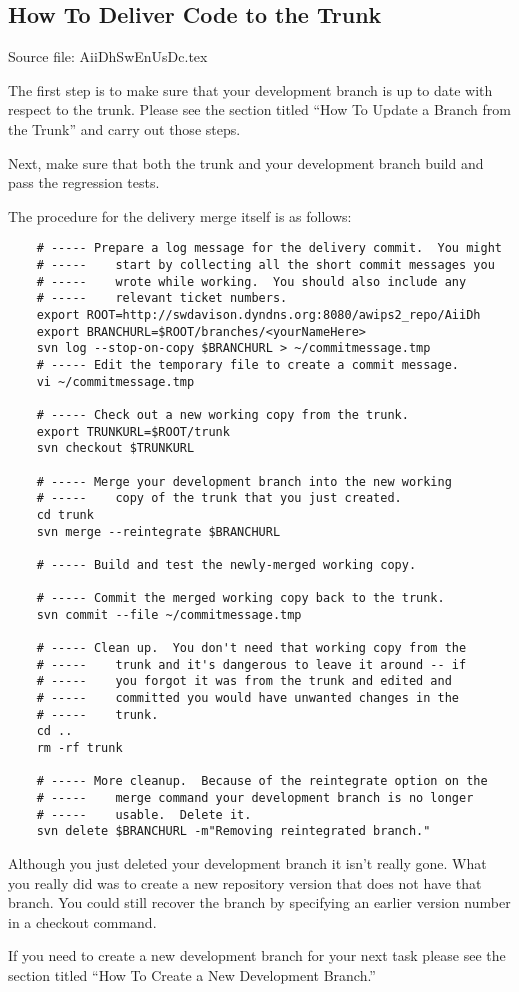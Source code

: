 
\subsection{How To Deliver Code to the Trunk}

Source file: AiiDhSwEnUsDc.tex

The first step is to make sure that your development branch is 
up to date with respect to the trunk.  Please see the section
titled ``How To Update a Branch from the Trunk'' and carry out
those steps.

Next, make sure that both the trunk and your development branch
build and pass the regression tests.

The procedure for the delivery merge itself is as follows:

\begin{verbatim}
    # ----- Prepare a log message for the delivery commit.  You might
    # -----    start by collecting all the short commit messages you
    # -----    wrote while working.  You should also include any 
    # -----    relevant ticket numbers.
    export ROOT=http://swdavison.dyndns.org:8080/awips2_repo/AiiDh
    export BRANCHURL=$ROOT/branches/<yourNameHere>
    svn log --stop-on-copy $BRANCHURL > ~/commitmessage.tmp
    # ----- Edit the temporary file to create a commit message.
    vi ~/commitmessage.tmp

    # ----- Check out a new working copy from the trunk.
    export TRUNKURL=$ROOT/trunk
    svn checkout $TRUNKURL

    # ----- Merge your development branch into the new working
    # -----    copy of the trunk that you just created.
    cd trunk
    svn merge --reintegrate $BRANCHURL

    # ----- Build and test the newly-merged working copy.

    # ----- Commit the merged working copy back to the trunk.
    svn commit --file ~/commitmessage.tmp

    # ----- Clean up.  You don't need that working copy from the 
    # -----    trunk and it's dangerous to leave it around -- if
    # -----    you forgot it was from the trunk and edited and 
    # -----    committed you would have unwanted changes in the
    # -----    trunk.
    cd ..
    rm -rf trunk

    # ----- More cleanup.  Because of the reintegrate option on the
    # -----    merge command your development branch is no longer 
    # -----    usable.  Delete it.
    svn delete $BRANCHURL -m"Removing reintegrated branch."
\end{verbatim}

Although you just deleted your development branch it isn't really 
gone.  What you really did was to create a new repository version
that does not have that branch.  You could still recover the branch
by specifying an earlier version number in a checkout command.

If you need to create a new development branch for your next
task please see the section
titled ``How To Create a New Development Branch.''



